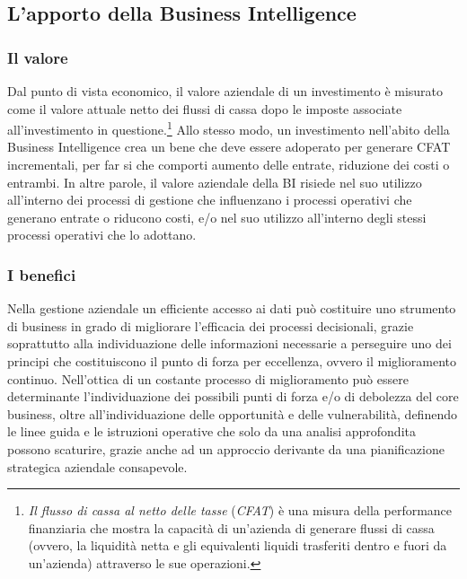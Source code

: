 \subsection{L'apporto della Business Intelligence}

\subsubsection{Il valore}

Dal punto di vista economico, il valore aziendale di un investimento è misurato come il valore attuale netto dei flussi di cassa dopo le imposte associate all'investimento in questione.\footnote{\textit{Il flusso di cassa al netto delle tasse} (\textit{CFAT}) è una misura della performance finanziaria che mostra la capacità di un'azienda di generare flussi di cassa (ovvero, la liquidità netta e gli equivalenti liquidi trasferiti dentro e fuori da un'azienda) attraverso le sue operazioni.\cite{cfat_definition}}
Allo stesso modo, un investimento nell'abito della Business Intelligence crea un bene che deve essere adoperato per generare CFAT incrementali, per far si che comporti aumento delle entrate, riduzione dei costi o entrambi. In altre parole, il valore aziendale della BI risiede nel suo utilizzo all'interno dei processi di gestione che influenzano i processi operativi che generano entrate o riducono costi, e/o nel suo utilizzo all'interno degli stessi processi operativi che lo adottano.\cite{decisionpath_bi_value}


\subsubsection{I benefici}

Nella gestione aziendale un efficiente accesso ai dati può costituire uno strumento di business in grado di migliorare l'efficacia dei processi decisionali, grazie soprattutto alla individuazione delle informazioni necessarie a perseguire uno dei principi che costituiscono il punto di forza per eccellenza, ovvero il miglioramento continuo. Nell'ottica di un costante processo di miglioramento può essere determinante l'individuazione dei possibili punti di forza e/o di debolezza del core business, oltre all'individuazione delle opportunità e delle vulnerabilità, definendo le linee guida e le istruzioni operative che solo da una analisi approfondita possono scaturire, grazie anche ad un approccio derivante da una pianificazione strategica aziendale consapevole.\cite{dalla_bi_al_dw}

